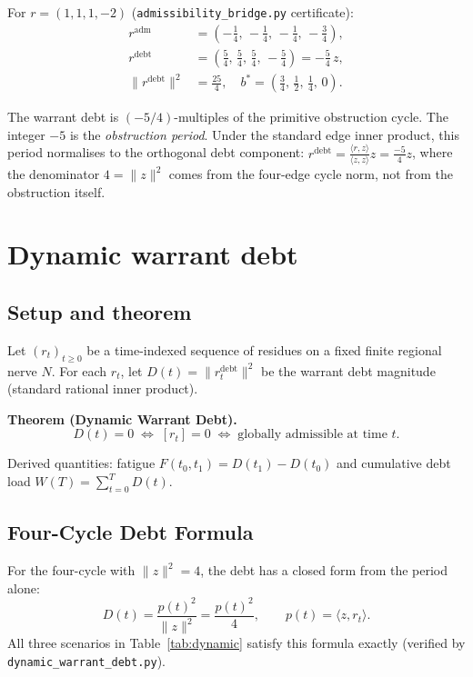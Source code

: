 \documentclass[11pt]{article}
\begin{document}
For $r=(1,1,1,-2)$ (\texttt{admissibility\_bridge.py} certificate):
\begin{align*}
r^{\mathrm{adm}} &= (-\tfrac{1}{4},\,-\tfrac{1}{4},\,-\tfrac{1}{4},\,-\tfrac{3}{4}), \\
r^{\mathrm{debt}} &= (\tfrac{5}{4},\,\tfrac{5}{4},\,\tfrac{5}{4},\,-\tfrac{5}{4})
  = -\tfrac{5}{4}\,z, \\
\|r^{\mathrm{debt}}\|^2 &= \tfrac{25}{4}, \quad
b^* = (\tfrac{3}{4},\,\tfrac{1}{2},\,\tfrac{1}{4},\,0).
\end{align*}

The warrant debt is $(-5/4)$-multiples of the primitive obstruction cycle.
The integer $-5$ is the \emph{obstruction period}. Under the standard edge
inner product, this period normalises to the orthogonal debt component:
$r^{\mathrm{debt}} = \tfrac{\langle r,z\rangle}{\langle z,z\rangle} z
= \tfrac{-5}{4} z$, where the denominator $4 = \|z\|^2$ comes from the four-edge
cycle norm, not from the obstruction itself.

\section{Dynamic warrant debt}\label{sec:dynamic}

\subsection*{Setup and theorem}
Let $(r_t)_{t\ge0}$ be a time-indexed sequence of residues on a fixed finite
regional nerve $N$. For each $r_t$, let $D(t)=\|r_t^{\mathrm{debt}}\|^2$ be the
warrant debt magnitude (standard rational inner product).

\textbf{Theorem (Dynamic Warrant Debt).}
\[
D(t)=0 \;\Longleftrightarrow\; [r_t]=0 \;\Longleftrightarrow\;
\text{globally admissible at time }t.
\]

Derived quantities: fatigue $F(t_0,t_1)=D(t_1)-D(t_0)$ and cumulative debt load
$W(T)=\sum_{t=0}^T D(t)$.

\subsection*{Four-Cycle Debt Formula}
For the four-cycle with $\|z\|^2=4$, the debt has a closed form from the period alone:
\[
D(t) = \frac{p(t)^2}{\|z\|^2} = \frac{p(t)^2}{4}, \qquad p(t)=\langle z,r_t\rangle.
\]
All three scenarios in Table~\ref{tab:dynamic} satisfy this formula exactly
(verified by \texttt{dynamic\_warrant\_debt.py}).
\end{document}
